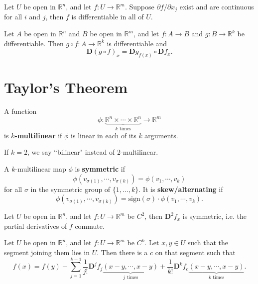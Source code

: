 \documentclass[10pt]{report}
\begin{document}
\begin{thrm}[]
Let $U$ be open in $\mathbb{R}^n$, and let $f:U \to \mathbb{R}^m$. Suppose $\partial f / \partial x_j$ exist and are continuous for all $i$ and $j$, then $f$ is differentiable in all of $U$.
\end{thrm}

\begin{thrm}
Let $A$ be open in $\mathbb{R}^n$ and $B$ be open in $\mathbb{R}^m$, and let $f:A\to B$ and $g:B \to \mathbb{R}^k$ be differentiable. Then $g \circ f: A \to \mathbb{R}^k$ is differentiable and
\[
	\mathbf{D}(g \circ f)_x = \mathbf{D}g_{f(x)} \circ \mathbf{D}f_x.
\] 
\end{thrm}


\section{Taylor's Theorem}

\begin{defn}[]
	A function \[\phi: \underbrace{\mathbb{R}^n \times \cdots \times \mathbb{R}^n}_{k \text{ times}} \to \mathbb{R}^m\] is \textbf{$k$-multilinear} if $\phi$ is linear in each of its $k$ arguments.
\end{defn}

If $k=2$, we say ``bilinear" instead of 2-multilinear.

\begin{defn}[]
A $k$-multilinear map $\phi$ is \textbf{symmetric} if
\[
	\phi(v_{\sigma(1)}, \cdots, v_{\sigma(k)}) = \phi(v_1, \cdots, v_k)
\] for all $\sigma$ in the symmetric group of $\{ 1, \dots, k\}$. It is \textbf{skew/alternating} if
\[
	\phi(v_{\sigma(1)}, \cdots, v_{\sigma(k)}) = \text{sign}(\sigma) \cdot \phi(v_1, \cdots, v_k).
\] 
\end{defn}

\begin{thrm}[]
	Let $U$ be open in $\mathbb{R}^n$, and let $f:U \to \mathbb{R}^m$ be $C^2$, then $\mathbf{D}^2f_x$ is symmetric, i.e. the partial derivatives of $f$ commute.
\end{thrm}

\begin{thrm}
Let $U$ be open in $\mathbb{R}^n$, and let $f: U \to \mathbb{R}^m$ be $C^k$. Let $x,y \in U$ such that the segment joining them lies in $U$. Then there is a $c$ on that segment such that
\[
	f(x) = f(y) + \sum_{j=1}^{k-1} \frac{1}{j!} \mathbf{D}^j f_j \underbrace{(x-y, \cdots, x-y)}_{j \text{ times}} + \frac{1}{k!} \mathbf{D}^k f_c \underbrace{(x-y, \cdots, x-y)}_{k \text{ times}}.
\] 
\end{thrm}
\end{document}
